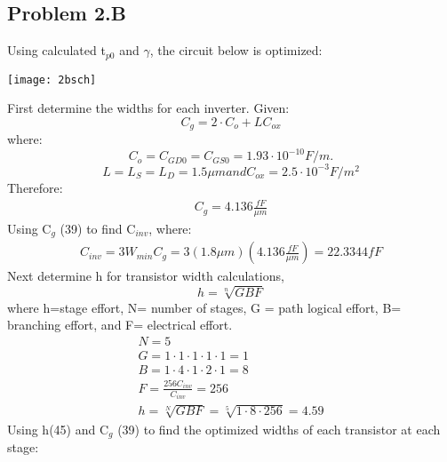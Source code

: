 \documentclass{article}
\begin{document}
\subsection{Problem 2.B}
Using calculated  t$_{p0}$ and $\gamma$, the circuit below is optimized:
\begin{center}
\texttt{[image: 2bsch]}
\end{center}
First determine the widths for each inverter. Given:
\begin{displaymath}
C_{g}=2\cdot C_{o} +LC_{ox}
\end{displaymath}
where:
\begin{displaymath}
 C_{o}=C_{GD0}=C_{GS0}=1.93\cdot 10^{-10}F/m.
\end{displaymath}
\begin{displaymath}
 L= L_{S} = L_{D} = 1.5 \mu m and C_{ox}=2.5 \cdot 10^{-3} F/m^{2}
\end{displaymath}
Therefore:
\begin{gather}
C_{g}= 4.136 \frac{fF}{\mu m}
\end{gather}
Using C$_{g}$ (39) to find C$_{inv}$, where:
\begin{gather}
C_{inv} = 3 W_{min} C_{g} = 3(1.8\mu m)(4.136 \frac{fF}{\mu m}) = 22.3344fF
\end{gather}
Next determine h for transistor width calculations,
\begin{displaymath}
h=\sqrt[n]{GBF}
\end{displaymath}
where h=stage effort, N= number of stages, G = path logical effort, B= branching effort, and F= electrical effort.
\begin{gather}
	N=5\\
	G=1\cdot 1 \cdot 1\cdot 1\cdot 1 =1\\
	B=1 \cdot 4\cdot 1\cdot 2\cdot 1=8\\
	F= \frac{256C_{inv}}{C_{inv}}=256\\
	h=\sqrt[N]{GBF}= \sqrt[5]{1\cdot 8 \cdot 256} = 4.59
	\end{gather}  
Using h(45) and C$_{g}$ (39) to find the optimized widths of each transistor at each stage:
\end{document}

